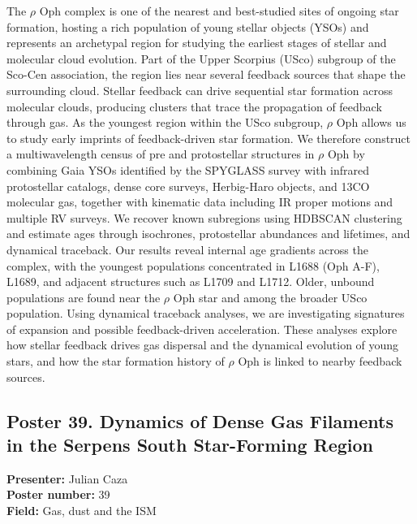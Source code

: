 The $\rho$ Oph complex is one of the nearest and best-studied sites of ongoing star formation, hosting a rich population of young stellar objects (YSOs) and represents an archetypal region for studying the earliest stages of stellar and molecular cloud evolution. Part of the Upper Scorpius (USco) subgroup of the Sco-Cen association, the region lies near several feedback sources that shape the surrounding cloud. Stellar feedback can drive sequential star formation across molecular clouds, producing clusters that trace the propagation of feedback through gas. As the youngest region within the USco subgroup, $\rho$ Oph allows us to study early imprints of feedback-driven star formation. We therefore construct a multiwavelength census of pre and protostellar structures in $\rho$ Oph by combining Gaia YSOs identified by the SPYGLASS survey with infrared protostellar catalogs, dense core surveys, Herbig-Haro objects, and 13CO molecular gas, together with kinematic data including IR proper motions and multiple RV surveys. We recover known subregions using HDBSCAN clustering and estimate ages through isochrones, protostellar abundances and lifetimes, and dynamical traceback. Our results reveal internal age gradients across the complex, with the youngest populations concentrated in L1688 (Oph A-F), L1689, and adjacent structures such as L1709 and L1712. Older, unbound populations are found near the $\rho$ Oph star and among the broader USco population. Using dynamical traceback analyses, we are investigating signatures of expansion and possible feedback-driven acceleration. These analyses explore how stellar feedback drives gas dispersal and the dynamical evolution of young stars, and how the star formation history of $\rho$ Oph is linked to nearby feedback sources.

\hypertarget{poster-abstract-talk-89}{}\label{poster-abstract-page-talk-89}
\subsection*{Poster 39. Dynamics of Dense Gas Filaments in the Serpens South Star-Forming Region}
\textbf{Presenter:} Julian Caza\\
\textbf{Poster number:} 39\\
\textbf{Field:} Gas, dust and the ISM

